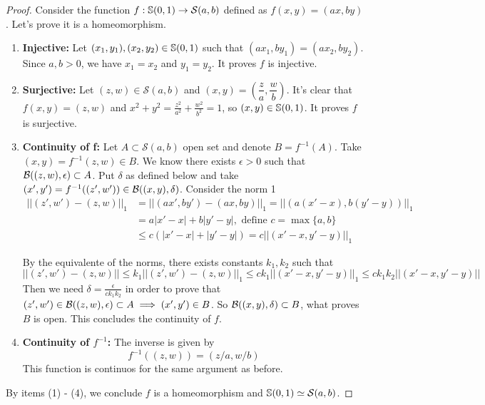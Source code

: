 \begin{proof}

Consider the function $f : \mathbb{S}(0,1) \to \mathcal{S}(a,b)$ defined as
$f(x,y) = (ax, by)$. Let's prove it is a homeomorphism. 

\begin{enumerate}
    \item \textbf{Injective:} Let $(x_1, y_1), (x_2, y_2) \in \mathbb{S}(0,1)$
    such that $(ax_1, by_1) = (ax_2, by_2)$. Since $a, b > 0$, we have $x_1 =
    x_2$ and $y_1 = y_2$. It proves $f$ is injective. 

    \item \textbf{Surjective:} Let $(z,w) \in \mathcal{S}(a,b)$ and $(x,y) =
    \left(\dfrac{z}{a}, \dfrac{w}{b}\right)$. It's clear that $f(x,y) = (z,w)$
    and $x^2 + y^2 = \frac{z^2}{a^2} + \frac{w^2}{b^2} = 1$, so $(x,y) \in
    \mathbb{S}(0,1)$. It proves $f$ is surjective. 
    
    \item \textbf{Continuity of f:} Let $A \subset \mathcal{S}(a,b)$ open set and denote
    $B = f^{-1}(A)$. Take $(x,y) = f^{-1}(z,w) \in B$. We know there exists
    $\epsilon > 0$ such that $\mathcal{B}((z,w), \epsilon) \subset A$. Put $\delta$ as
    defined below and 
    take $(x', y') = f^{-1}((z', w')) \in \mathcal{B}((x,y),\delta)$. Consider the norm
    1
    \begin{equation*}
        \begin{split}
            ||(z',w')-(z,w)||_1 &= ||(ax', by') - (ax, by)||_1 = ||\left(a(x' - x), b(y' - y)\right)||_1 \\ 
            &= a|x' - x| + b|y' - y|, \text{ define } c = \max\{a,b\}\\        
            &\le c(|x' - x| + |y' - y|) = c||(x' - x, y' - y)||_1
        \end{split}
    \end{equation*}

    By the equivalente of the norms, there exists constants $k_1, k_2$ such that 
    $$
    ||(z',w')-(z,w)|| \le k_1||(z',w')-(z,w)||_1 \le ck_1||(x' - x, y' - y)||_1 \le ck_1k_2||(x' - x, y' - y)|| 
    $$
    Then we need $\delta = \frac{\epsilon}{c k_1 k_2}$ in order to prove that
    $(z',w') \in \mathcal{B}((z,w), \epsilon) \subset A \implies (x',y') \in B$. So
    $\mathcal{B}((x,y),\delta) \subset B$, what proves $B$ is open. This concludes the
    continuity of $f$. 

    \item \textbf{Continuity of $f^{-1}$:} The inverse is given by 
    $$
    f^{-1}((z,w)) = (z/a, w/b)
    $$
    This function is continuos for the same argument as before. 
\end{enumerate}

By items (1) - (4), we conclude $f$ is a homeomorphism and $\mathbb{S}(0,1) \simeq
\mathcal{S}(a,b)$.

\end{proof}

